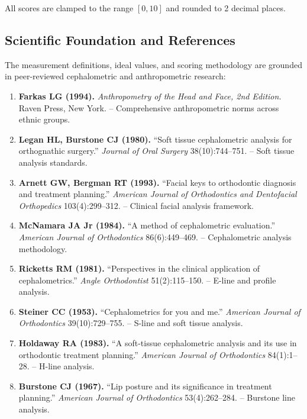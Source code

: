 All scores are clamped to the range $[0, 10]$ and rounded to 2 decimal places.

\subsection{Scientific Foundation and References}

The measurement definitions, ideal values, and scoring methodology are grounded in peer-reviewed cephalometric and anthropometric research:

\begin{enumerate}
    \item \textbf{Farkas LG (1994).} \textit{Anthropometry of the Head and Face, 2nd Edition.} Raven Press, New York. -- Comprehensive anthropometric norms across ethnic groups.
    
    \item \textbf{Legan HL, Burstone CJ (1980).} ``Soft tissue cephalometric analysis for orthognathic surgery.'' \textit{Journal of Oral Surgery} 38(10):744--751. -- Soft tissue analysis standards.
    
    \item \textbf{Arnett GW, Bergman RT (1993).} ``Facial keys to orthodontic diagnosis and treatment planning.'' \textit{American Journal of Orthodontics and Dentofacial Orthopedics} 103(4):299--312. -- Clinical facial analysis framework.
    
    \item \textbf{McNamara JA Jr (1984).} ``A method of cephalometric evaluation.'' \textit{American Journal of Orthodontics} 86(6):449--469. -- Cephalometric analysis methodology.
    
    \item \textbf{Ricketts RM (1981).} ``Perspectives in the clinical application of cephalometrics.'' \textit{Angle Orthodontist} 51(2):115--150. -- E-line and profile analysis.
    
    \item \textbf{Steiner CC (1953).} ``Cephalometrics for you and me.'' \textit{American Journal of Orthodontics} 39(10):729--755. -- S-line and soft tissue analysis.
    
    \item \textbf{Holdaway RA (1983).} ``A soft-tissue cephalometric analysis and its use in orthodontic treatment planning.'' \textit{American Journal of Orthodontics} 84(1):1--28. -- H-line analysis.
    
    \item \textbf{Burstone CJ (1967).} ``Lip posture and its significance in treatment planning.'' \textit{American Journal of Orthodontics} 53(4):262--284. -- Burstone line analysis.
\end{enumerate}

